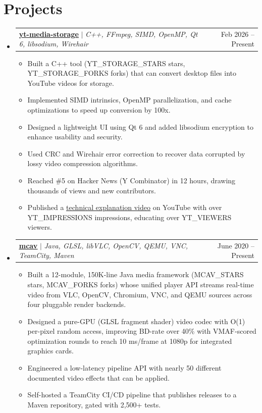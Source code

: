 \documentclass[letterpaper,11pt]{article}
\makeatletter
\let\oldhref\href
\renewcommand{\href}[2]{\oldhref{#1}{\uline{#2}}}
\newcommand{\resumeItem}[1]{
    \item\small{
            {#1 \vspace{-2pt}}
    }
}
\newcommand{\resumeProjectHeading}[2]{
    \item
    \begin{tabular*}{0.97\textwidth}{l@{\extracolsep{\fill}}r}
    \small#1 & #2 \\
    \end{tabular*}\vspace{-7pt}
}
\newcommand{\resumeSubHeadingListStart}{\begin{itemize}[leftmargin=0.15in, label={}]}
\newcommand{\resumeSubHeadingListEnd}{\end{itemize}}
\newcommand{\resumeItemListStart}{\begin{itemize}}
\newcommand{\resumeItemListEnd}{\end{itemize}\vspace{-5pt}}
\makeatother
\begin{document}
    \section{Projects}
    \resumeSubHeadingListStart
    \resumeProjectHeading
    {\href{https://github.com/PulseBeat02/yt-media-storage}{\textbf{yt-media-storage}} $|$ \emph{C++, FFmpeg, SIMD, OpenMP, Qt 6, libsodium, Wirehair}}{Feb 2026 -- Present}
    \resumeItemListStart
    \resumeItem{Built a C++ tool ({{YT_STORAGE_STARS}} stars, {{YT_STORAGE_FORKS}} forks) that can convert desktop files into YouTube videos for storage.}
    \resumeItem{Implemented SIMD intrinsics, OpenMP parallelization, and cache optimizations to speed up conversion by 100x.}
    \resumeItem{Designed a lightweight UI using Qt 6 and added libsodium encryption to enhance usability and security.}
    \resumeItem{Used CRC and Wirehair error correction to recover data corrupted by lossy video compression algorithms.}
    \resumeItem{Reached \#5 on Hacker News (Y Combinator) in 12 hours, drawing thousands of views and new contributors.}
    \resumeItem{Published a \href{https://www.youtube.com/watch?v=l03Os5uwWmk}{technical explanation video} on YouTube with over {{YT_IMPRESSIONS}} impressions, educating over {{YT_VIEWERS}} viewers.}
    \resumeItemListEnd
    \vspace{1mm}
    \resumeProjectHeading
    {\href{https://github.com/PulseBeat02/mcav}{\textbf{mcav}} $|$ \emph{Java, GLSL, libVLC, OpenCV, QEMU, VNC, TeamCity, Maven}}{June 2020 -- Present}
    \resumeItemListStart
    \resumeItem{Built a 12-module, 150K-line Java media framework ({{MCAV_STARS}} stars, {{MCAV_FORKS}} forks) whose unified player API streams real-time video from VLC, OpenCV, Chromium, VNC, and QEMU sources across four pluggable render backends.}
    \resumeItem{Designed a pure-GPU (GLSL fragment shader) video codec with O(1) per-pixel random access, improving BD-rate over 40\% with VMAF-scored optimization rounds to reach 10 ms/frame at 1080p for integrated graphics cards.}
    \resumeItem{Engineered a low-latency pipeline API with nearly 50 different documented video effects that can be applied.}
    \resumeItem{Self-hosted a TeamCity CI/CD pipeline that publishes releases to a Maven repository, gated with 2,500+ tests.}
    \resumeItemListEnd
    \resumeSubHeadingListEnd


\end{document}
